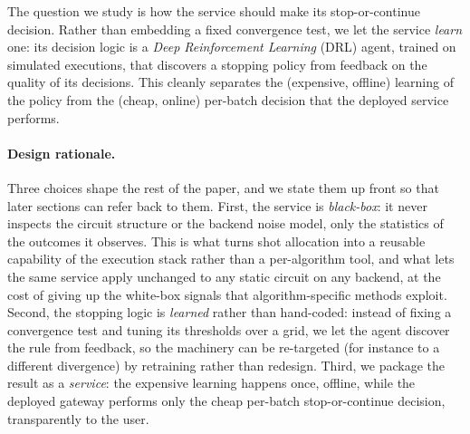 \documentclass[runningheads]{llncs}
\begin{document}
The question we study is how the service should make its stop-or-continue
decision. Rather than embedding a fixed convergence test, we let the service
\emph{learn} one: its decision logic is a \emph{Deep Reinforcement Learning}
(DRL) agent, trained on simulated executions, that discovers a stopping policy
from feedback on the quality of its decisions. This cleanly separates the
(expensive, offline) learning of the policy from the (cheap, online) per-batch
decision that the deployed service performs.

\paragraph{Design rationale.} Three choices shape the rest of the paper, and we
state them up front so that later sections can refer back to them. First, the
service is \emph{black-box}: it never inspects the circuit structure or the
backend noise model, only the statistics of the outcomes it observes. This is
what turns shot allocation into a reusable capability of the execution stack
rather than a per-algorithm tool, and what lets the same service apply unchanged
to any static circuit on any backend, at the cost of giving up the white-box
signals that algorithm-specific methods exploit. Second, the stopping logic is
\emph{learned} rather than hand-coded: instead of fixing a convergence test and
tuning its thresholds over a grid, we let the agent discover the rule from
feedback, so the machinery can be re-targeted (for instance to a different
divergence) by retraining rather than redesign. Third, we package the result as
a \emph{service}: the expensive learning happens once, offline, while the
deployed gateway performs only the cheap per-batch stop-or-continue decision,
transparently to the user.
\end{document}
